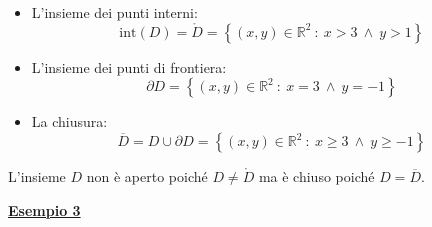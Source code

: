 \documentclass[a4paper]{article}
\newcommand{\example}[1]{\textcolor{Green4}{\textbf{#1}}}
\begin{document}
	\begin{itemize}
		\item L'insieme dei punti interni:
		\begin{equation*}
			\mathrm{int}\left(D\right) = \mathring{D} = \left\{\left(x,y\right) \in \mathbb{R}^{2} \: : \: x > 3 \: \land \: y > 1\right\}
		\end{equation*}

		\item L'insieme dei punti di frontiera:
		\begin{equation*}
			\partial D = \left\{\left(x,y\right) \in \mathbb{R}^{2} \: : \: x = 3 \: \land \: y = -1\right\}
		\end{equation*}

		\item La chiusura:
		\begin{equation*}
			\overline{D} = D \cup \partial D = \left\{\left(x,y\right) \in \mathbb{R}^{2} \: : \: x \ge 3 \: \land \: y \ge -1\right\}
		\end{equation*}
	\end{itemize}
	L'insieme $D$ non è aperto poiché $D \ne \mathring{D}$ ma è chiuso poiché $D = \overline{D}$.\newpage

	\begin{flushleft}
		\example{\underline{Esempio 3}}
	\end{flushleft}
\end{document}
